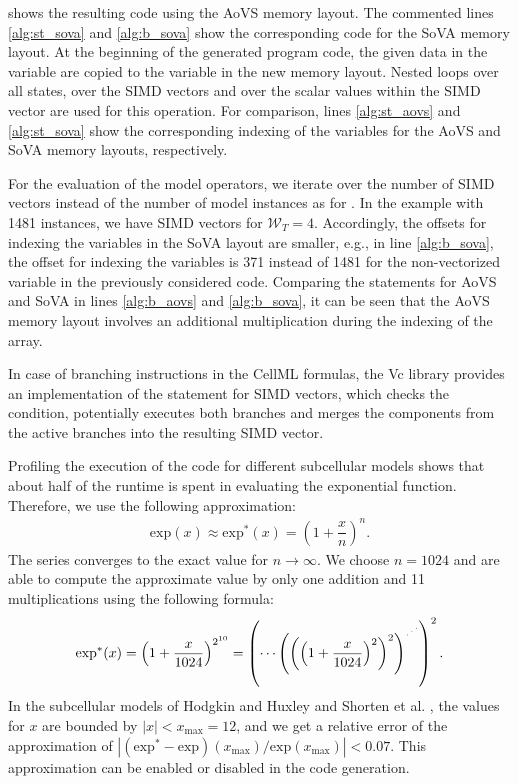  shows the resulting code using the AoVS memory layout. The commented lines \ref{alg:st_sova} and \ref{alg:b_sova} show the corresponding code for the SoVA memory layout.
At the beginning of the generated program code, the given data in the  variable are copied to the  variable in the new memory layout. Nested loops over all states, over the SIMD vectors and over the scalar values within the SIMD vector are used for this operation. For comparison, lines \ref{alg:st_aovs} and \ref{alg:st_sova} show the corresponding indexing of the  variables for the AoVS and SoVA memory layouts, respectively.

For the evaluation of the model operators, we iterate over the number  of SIMD vectors instead of the number of model instances as for . In the example with 1481 instances, we have  SIMD vectors for $\mathcal{W}_T=4$. 
Accordingly, the offsets for indexing the variables in the SoVA layout are smaller, e.g., in line \ref{alg:b_sova}, the offset for indexing the  variables is 371 instead of 1481 for the non-vectorized variable in the previously considered  code. 
Comparing the statements for AoVS and SoVA in lines \ref{alg:b_aovs} and \ref{alg:b_sova}, it can be seen that the AoVS memory layout involves an additional multiplication during the indexing of the array.

In case of branching instructions in the CellML formulas, the Vc library provides an implementation of the  statement for SIMD vectors, which checks the condition, potentially executes both branches and merges the components from the active branches into the resulting SIMD vector.

Profiling the execution of the  code for different subcellular models shows that about half of the runtime is spent in evaluating the exponential function. Therefore, we use the following approximation:
\begin{align}\label{eq:apx-e-function}
  \textrm{exp}(x) \approx \textrm{exp}^\ast(x) = \left( 1 + \dfrac{x}{n}\right)^n.
\end{align}
The series converges to the exact value for $n\to \infty$. We choose $n=1024$ and are able to compute the approximate value by only one addition and 11 multiplications using the following formula:
\begin{align*}
    \textrm{exp}^\ast(x) = \left( 1 + \dfrac{x}{1024}\right)^{2^{10}} = \left(\cdots{{\left({\left(\left( 1 + \dfrac{x}{1024}\right)^2\right)}^2\right)}^{\scriptsize\iddots}}\right)^2.
\end{align*}
%
In the subcellular models of Hodgkin and Huxley \cite{Hodgkin1952} and Shorten et al. \cite{shorten2007mathematical}, the values for $x$ are bounded by $|x| < x_\text{max} = 12$, and we get a relative error of the approximation of $|(\textrm{exp}^\ast - \textrm{exp})(x_\text{max}) / \textrm{exp}(x_\text{max})| < 0.07.$
This approximation can be enabled or disabled in the code generation.


